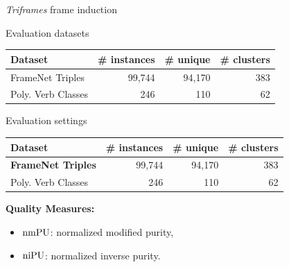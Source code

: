 \begin{frame}{\textit{Triframes} frame induction}

\vspace{-10pt}
\begin{algorithmic}
\pause 
{}
\pause 
{}
\ENDFOR
{}
\end{algorithmic}

	
\end{frame}



\begin{frame}{Evaluation datasets}


\begin{tabular}{lrrr}
\textbf{Dataset} & \textbf{\# instances} & \textbf{\# unique} & \textbf{\# clusters} \\\toprule
FrameNet Triples   & 99,744 & 94,170 & 383 \\
Poly. Verb Classes &    246 &    110 & 62 \\
\end{tabular}
	
\end{frame}


\begin{frame}{Evaluation settings}


\begin{tabular}{lrrr}
\textbf{Dataset} & \textbf{\# instances} & \textbf{\# unique} & \textbf{\# clusters} \\\toprule
\textbf{\alert{FrameNet Triples}}   & 99,744 & 94,170 & 383 \\
Poly. Verb Classes &    246 &    110 & 62 \\
\end{tabular}

\pause 

\vspace{20pt}
\textbf{Quality Measures:}

\begin{itemize}
\item $\operatorname{\mathrm{nmPU}}$: normalized modified purity, 
\item $\operatorname{\mathrm{niPU}}$: normalized inverse purity.	
\end{itemize}

	
\end{frame}



